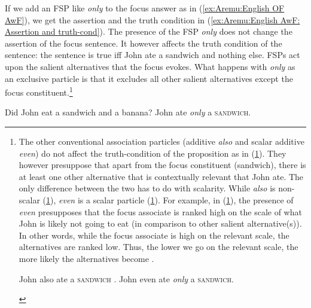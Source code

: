 \documentclass[output=paper,colorlinks,citecolor=brown,draftmode
]{langscibook}
\begin{document}
If we add an FSP like \textit{only} to the focus answer as in (\ref{ex:Aremu:English OF AwF}), we get the assertion and the truth condition in (\ref{ex:Aremu:English AwF: Assertion and truth-cond}). The presence of the FSP \textit{only} does not change the assertion of the focus sentence. It however affects the truth condition of the sentence: the sentence is true iff John ate a sandwich and nothing else. FSPs act upon the salient alternatives that the focus evokes. What happens with \textit{only} as an exclusive particle is that it excludes all other salient alternatives except the focus constituent.\footnote{The other conventional association particles (additive \textit{also} and scalar additive \textit{even}) do not affect the truth-condition of the proposition as in (\ref{ex:Aremu:English AwF even and also}). They however presuppose that apart from the focus constituent (sandwich), there is at least one other alternative that is contextually relevant that John ate. The only difference between the two has to do with scalarity. While \textit{also} is non-scalar (\ref{ex:Aremu:English OF AwF 'also'}), \textit{even} is a scalar particle (\ref{ex:Aremu:English OF AwF 'even'}). For example, in (\ref{ex:Aremu:English OF AwF 'even'}), the presence of \textit{even} presupposes that the focus associate is ranked high on the scale of what John is likely not going to eat (in comparison to other salient alternative(s)). In other words, while the focus associate is high on the relevant scale, the alternatives are ranked low. Thus, the lower we go on the relevant scale, the more likely the alternatives become \citep[see a.o.,][]{konig1991meaning, jacobs1983fokus, beaver2008sense, hole2017crosslinguistic}.

\ea \label{ex:Aremu:English AwF even and also} 

\begin{xlist}

\ex John also ate a \textsc{sandwich} \label{ex:Aremu:English OF AwF 'also'}.
\ex John even ate \textit{only} a \textsc{sandwich}. \label{ex:Aremu:English OF AwF 'even'}

\end{xlist} 
\z
}

\ea \label{ex:Aremu:English AwF} 

\begin{xlist}

\ex Did John eat a sandwich and a banana? \label{ex:Aremu:English OF question2}
\ex John ate \textit{only} a \textsc{sandwich}. \label{ex:Aremu:English OF AwF}

\end{xlist} 
\z
\end{document}
